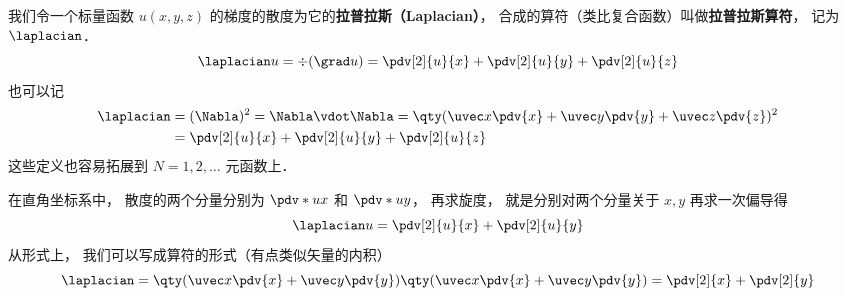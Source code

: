 

我们令一个标量函数 $u(x, y, z)$ 的梯度的散度为它的\textbf{拉普拉斯（Laplacian）}， 合成的算符（类比复合函数）叫做\textbf{拉普拉斯算符}， 记为 $\laplacian$．
\begin{equation}
\laplacian u = \div (\grad u) = \pdv[2]{u}{x} + \pdv[2]{u}{y} + \pdv[2]{u}{z}
\end{equation}
也可以记
\begin{equation}
\begin{aligned}
\laplacian &= (\Nabla)^2 = \Nabla \vdot \Nabla = \qty(\uvec x\pdv{x} + \uvec y\pdv{y} + \uvec z\pdv{z})^2\\
&= \pdv[2]{u}{x} + \pdv[2]{u}{y} + \pdv[2]{u}{z}
\end{aligned}
\end{equation}
这些定义也容易拓展到 $N = 1, 2, \dots$ 元函数上．

在直角坐标系中， 散度的两个分量分别为 $\pdv*{u}{x}$ 和 $\pdv*{u}{y}$， 再求旋度， 就是分别对两个分量关于 $x, y$ 再求一次偏导得
\begin{equation}
\laplacian u = \pdv[2]{u}{x} + \pdv[2]{u}{y}
\end{equation}
从形式上， 我们可以写成算符的形式（有点类似矢量的内积）
\begin{equation}
\laplacian = \qty(\uvec x \pdv{x} + \uvec y \pdv{y}) \qty (\uvec x \pdv{x}  + \uvec y \pdv{y})
= \pdv[2]{x} + \pdv[2]{y}
\end{equation}
